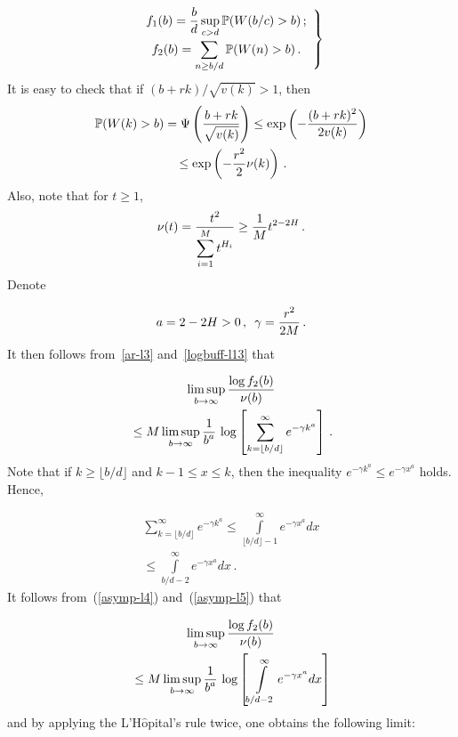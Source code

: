 \begin{multicols}{2}
\noindent
\begin{equation}
\left.
\begin{array}{c}
f_1(b)=\displaystyle\displaystyle\frac{\displaystyle b\mathstrut}{\displaystyle d\mathstrut}\sup\limits_{c>d}\mathbb{P} (W(b/c)>b)\,;\\[9pt]
f_2(b)=\displaystyle\sum\limits_{n \geq b/d}\mathbb{P} (W(n)>b)\,.
\end{array}
\right\}
\label{16}
\end{equation}
It is easy to check that if  $(b+rk)/\sqrt{v(k)}>1$, then
\begin{multline}
\mathbb{P}(W(k) >b) = \Psi \left( \displaystyle\frac{\displaystyle b+rk\mathstrut}{\displaystyle \sqrt{v(k)}\mathstrut} \right) \le
\exp \left( -\displaystyle\frac{\displaystyle (b+rk)^2\mathstrut}{\displaystyle 2v(k)\mathstrut} \right)\\
{}\le \exp\left(-\displaystyle\frac{\displaystyle r^2\mathstrut}{\displaystyle 2\mathstrut}\nu(k)\right)\,.
\label{ar-l3}
\end{multline}
Also, note   that  for $t\ge1$,
\begin{equation}
\nu(t)=\displaystyle\frac{\displaystyle t^2\mathstrut}{\displaystyle \sum\limits_{i=1}^M t^{H_i}\mathstrut}\geq
\displaystyle\frac{\displaystyle 1\mathstrut}{\displaystyle M\mathstrut}t^{2-2H}\,.
\label{logbuff-l13}
\end{equation}
Denote

\noindent
$$
 a=2-2H>0\,,\enskip \gamma=\displaystyle\frac{\displaystyle r^2\mathstrut}{\displaystyle 2M\mathstrut}\,.
 $$
It  then follows from~\eqref{ar-l3} and~\eqref{logbuff-l13} that

\columnbreak

\noindent
\begin{multline}
\limsup\limits_{b \to \infty} \displaystyle\frac{\displaystyle \log f_2(b)\mathstrut}{\displaystyle \nu(b)\mathstrut}\\
{} \le M\limsup\limits_{b \to
\infty}\displaystyle\frac{\displaystyle 1\mathstrut}{\displaystyle  b^{a}\mathstrut}\,\log \left[\sum\limits_{k=\lfloor b/d
\rfloor}^\infty e^{-\gamma k^a}\right]\,.
\label{asymp-l4}
\end{multline}
 Note that if $k \geq \lfloor b/d \rfloor$ and $k-1\leq x \leq k$,
then the inequality $ e^{-\gamma k^a}\leq e^{-\gamma x^a}$ holds. Hence,

\vspace*{-2pt}

\noindent
\begin{multline}
\sum\limits_{k=\lfloor b/d \rfloor}^\infty e^{-\gamma k^a} \leq
\int\limits_{\lfloor b/d \rfloor-1}^\infty e^{-\gamma x^a}dx\\[-1pt]
{} \leq
\int\limits_{b/d-2}^\infty e^{-\gamma x^a}dx\,.
\label{asymp-l5}
\end{multline}
It follows from~(\ref{asymp-l4}) and~(\ref{asymp-l5}) that

\vspace*{-2pt}

\noindent
\begin{multline}
\limsup\limits_{b \to \infty}\displaystyle\frac{\displaystyle  \log f_2(b)\mathstrut}{\displaystyle \nu(b)\mathstrut}\\
{}\leq M
\limsup\limits_{b \to \infty}\displaystyle\frac{\displaystyle 1\mathstrut}{\displaystyle  b^{a}\mathstrut}\,\log
\left[ \int\limits_{b/d-2}^\infty
e^{-\gamma x^a}dx\right]
\label{ar-l6}
\end{multline}
and by applying  the L'H$\hat{\mbox{o}}$pital's rule twice, one obtains the
following limit:
\vspace*{-2pt}


\end{multicols}
